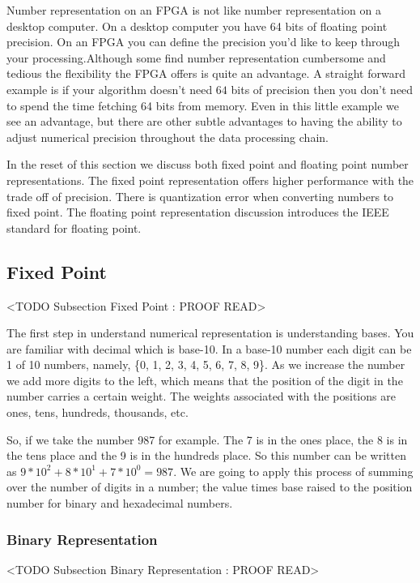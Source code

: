 Number representation on an \ac{FPGA} is not like number representation on a desktop computer. On a desktop computer you have 64 bits of floating point precision. On an \ac{FPGA} you can define the precision you'd like to keep through your processing.Although some find number representation cumbersome and tedious the flexibility the \ac{FPGA} offers is quite an advantage. A straight forward example is if your algorithm doesn't need $64$ bits of precision then you don't need to spend the time fetching 64 bits from memory. Even in this little example we see an advantage, but there are other subtle advantages to having the ability to adjust numerical precision throughout the data processing chain.

In the reset of this section we discuss both fixed point and floating point number representations. The fixed point representation offers higher performance with the trade off of precision. There is quantization error when converting numbers to fixed point. The floating point representation discussion introduces the \ac{IEEE} standard for floating point.
	
\subsection{Fixed Point}
	<TODO Subsection Fixed Point : PROOF READ>

The first step in understand numerical representation is understanding bases. You are familiar with decimal which is base-10. In a base-10 number each digit can be 1 of 10 numbers, namely, \{0, 1, 2, 3, 4, 5, 6, 7, 8, 9\}. As we increase the number we add more digits to the left, which means that the position of the digit in the number carries a certain weight. The weights associated with the positions are ones, tens, hundreds, thousands, etc.

So, if we take the number 987 for example. The 7 is in the ones place, the 8 is in the tens place and the 9 is in the hundreds place. So this number can be written as $9*10^2 + 8*10^1 + 7*10^0 = 987$. We are going to apply this process of summing over the number of digits in a number; the value times base raised to the position number for binary and hexadecimal numbers. 

\subsubsection{Binary Representation}
	<TODO Subsection Binary Representation : PROOF READ>
	
